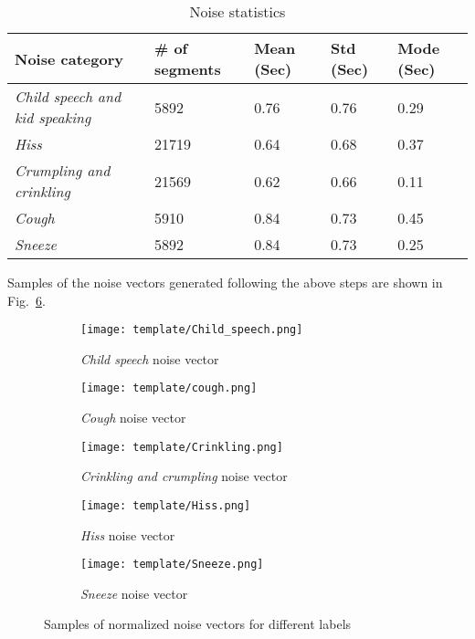\documentclass[sigconf,screen]{acmart}
\begin{document}
\begin{table}[]
	\caption{Noise statistics}
	\label{Noise_statistics}\centering
\begin{tabular}{p{3.7cm}p{1cm}p{0.75cm}p{0.75cm}p{0.75cm}}
Noise category & \# of segments & Mean (Sec) & Std (Sec) & Mode (Sec) \\ \hline
\textit{Child speech and kid speaking} & 5892           & 0.76       & 0.76                                                & 0.29       \\ \hline
\textit{Hiss}                     & 21719          & 0.64       & 0.68                                                & 0.37       \\ \hline
\textit{Crumpling and crinkling}        & 21569          & 0.62       & 0.66                                                & 0.11       \\ \hline
\textit{Cough}                     & 5910           & 0.84       & 0.73                                                & 0.45       \\ \hline
\textit{Sneeze}                      & 5892           & 0.84       & 0.73                                                & 0.25  \\ \hline 
\end{tabular}
\end{table}
Samples of the noise vectors generated following the above steps are shown in Fig.~\ref{fig:Noise_samples}.
\begin{figure}
	\begin{subfigure}{.48\textwidth}
		\centering
		\texttt{[image: template/Child\_speech.png]}
		\caption{\textit{Child speech} noise vector}
		\label{fig:Child_speech}
	\end{subfigure}
	\begin{subfigure}{.48\textwidth}
		\centering
		\texttt{[image: template/cough.png]}
		\caption{\textit{Cough} noise vector}
		\label{fig:cough}
	\end{subfigure}
	\begin{subfigure}{.48\textwidth}
		\centering
		\texttt{[image: template/Crinkling.png]}
		\caption{\textit{Crinkling and crumpling} noise vector}
		\label{fig:Crinkling}
	\end{subfigure}
	\begin{subfigure}{.48\textwidth}
		\centering
		\texttt{[image: template/Hiss.png]}
		\caption{\textit{Hiss} noise vector}
		\label{fig:Hiss}
	\end{subfigure}
	\begin{subfigure}{.48\textwidth}
		\centering
		\texttt{[image: template/Sneeze.png]}
		\caption{\textit{Sneeze} noise vector}
		\label{fig:Sneeze}
	\end{subfigure}
	\caption{Samples of normalized noise vectors for different labels}
	\label{fig:Noise_samples}
\end{figure}
\end{document}
